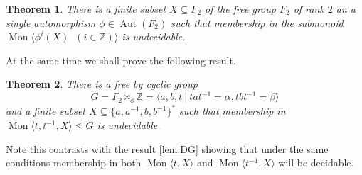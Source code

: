\documentclass[11pt]{amsart}
\newcommand{\Mgen}[1]{\operatorname{Mon}\bigl\langle #1 \bigr\rangle}
\newcommand{\Gpres}[2]{\bigl\langle #1\:|\:#2 \bigr\rangle}
\DeclareMathOperator{\Aut}{Aut}
\newcommand{\Z}{\mathbb{Z}}
\theoremstyle{plain}
\newtheorem{theorem}{Theorem}[section]
\theoremstyle{definition}
\begin{document}
\begin{theorem}\label{thm:AutFreeGroupMonGen} 
There is a finite subset $X \subseteq F_2$ of the free group $F_2$ of rank $2$ an a single automorphism $\phi \in \Aut(F_2)$ such that membership in the submonoid 
$
\Mgen{\phi^i(X) \; \; (i \in \Z) }
$   
is undecidable.  
  \end{theorem}

At the same time we shall prove the following result. 

\begin{theorem}\label{thm:AutFreeGroupMonGenFreeByCyclic} 
There is a free by cyclic group 
\[
G = F_2 \rtimes_\phi \Z = 
\Gpres{a,b,t}{tat^{-1} = \alpha, tbt^{-1} = \beta}
\]
and a finite subset $X \subseteq \{ a,a^{-1}, b, b^{-1} \}^*$ such that membership in $\Mgen{t,t^{-1}, X} \leq G$ is undecidable.    
  \end{theorem}
Note this contrasts with the result 
\cref{lem:DG}
showing that under the same conditions membership in both $\Mgen{t, X}$ and $\Mgen{t^{-1}, X}$ will be decidable.    
\end{document}
